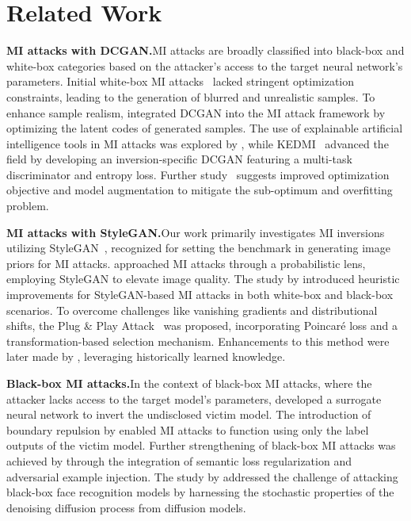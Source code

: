 \section{Related Work}
\label{related}
\textbf{MI attacks with DCGAN.}\quad MI attacks are broadly classified into black-box and white-box categories based on the attacker's access to the target neural network's parameters.
Initial white-box MI attacks~\cite{mi15} lacked stringent optimization constraints, leading to the generation of blurred and unrealistic samples.
To enhance sample realism, \cite{gmi20cvpr} integrated DCGAN into the MI attack framework by optimizing the latent codes of generated samples.
The use of explainable artificial intelligence tools in MI attacks was explored by \cite{xai21iccv}, while KEDMI~\cite{kedmi21iccv} advanced the field by developing an inversion-specific DCGAN featuring a multi-task discriminator and entropy loss.
Further study~\cite{rethink23cvpr} suggests improved optimization objective and model augmentation to mitigate the sub-optimum and overfitting problem.

\noindent
\textbf{MI attacks with StyleGAN.}\quad Our work primarily investigates MI inversions utilizing StyleGAN~\cite{stylegan2_20cvpr}, recognized for setting the benchmark in generating image priors for MI attacks.
\cite{vmi21nips} approached MI attacks through a probabilistic lens, employing StyleGAN to elevate image quality.
The study by \cite{mirror22ndss} introduced heuristic improvements for StyleGAN-based MI attacks in both white-box and black-box scenarios.
To overcome challenges like vanishing gradients and distributional shifts, the Plug \& Play Attack~\cite{ppa22icml} was proposed, incorporating Poincar\'e loss and a transformation-based selection mechanism.
Enhancements to this method were later made by \cite{mi23mm}, leveraging historically learned knowledge.

\noindent
\textbf{Black-box MI attacks.}\quad In the context of black-box MI attacks, where the attacker lacks access to the target model's parameters, \cite{blackbox19ccs} developed a surrogate neural network to invert the undisclosed victim model. The introduction of boundary repulsion by \cite{blackbox22cvpr} enabled MI attacks to function using only the label outputs of the victim model. Further strengthening of black-box MI attacks was achieved by \cite{blackbox23tdsc} through the integration of semantic loss regularization and adversarial example injection. The study by \cite{mi23iccvw} addressed the challenge of attacking black-box face recognition models by harnessing the stochastic properties of the denoising diffusion process from diffusion models.

